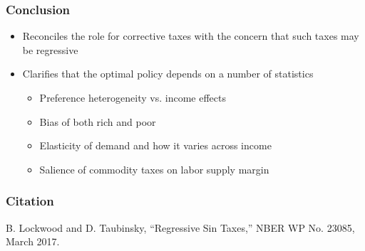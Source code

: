 \documentclass{beamer}
\begin{document}
\begin{frame}
\frametitle{Conclusion} 

\begin{itemize}
	\item Reconciles the role for corrective taxes with the concern that such taxes may be regressive
	\item Clarifies that the optimal policy depends on a number of statistics
	\begin{itemize}
		\item Preference heterogeneity vs. income effects 
		\item Bias of both rich and poor 
		\item Elasticity of demand and how it varies across income
		\item Salience of commodity taxes on labor supply margin 
	\end{itemize}

\end{itemize}

\end{frame}
	
	
	\begin{frame}
	\frametitle{Citation} 
	
	B. Lockwood and D. Taubinsky, “Regressive Sin Taxes,” NBER WP No. 23085, March 2017.
	
	\end{frame}
	
	
\end{document}
